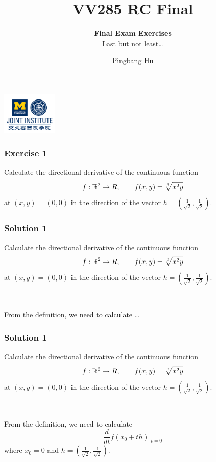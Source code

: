 \documentclass[10pt, t, allowdisplaybreaks]{beamer}
\title{VV285 RC Final}
\subtitle{\textbf{Final Exam Exercises}\\\large Last but not least\dots}
\institute[UM-SJTU JI]{University of Michigan-Shanghai Jiao Tong University Joint Institute}
\author{Pingbang Hu}
\newcommand{\nullspacesmall}{~\vspace{1em}}
\newcommand{\at}[3]{\left.#1\right\vert_{#2}^{#3}}
\begin{document}
\begin{frame}
    \titlepage
    \begin{center}
        \includegraphics[height=2cm]{Figures/logo/logo2.png}
    \end{center}
\end{frame}

\begin{frame}
    \frametitle{Exercise 1}
    \par Calculate the directional derivative of the continuous function
    \begin{equation*}
        f:\mathbb{R}^2\rightarrow R, \qquad f(x,y) = \sqrt[3]{x^2y}
    \end{equation*}
    at $(x,y) = (0,0)$ in the direction of the vector $h = (\frac{1}{\sqrt{2}}, \frac{1}{\sqrt{2}})$.
\end{frame}


\begin{frame}
    \frametitle{Solution 1}
    \par Calculate the directional derivative of the continuous function
    \begin{equation*}
        f:\mathbb{R}^2\rightarrow R, \qquad f(x,y) = \sqrt[3]{x^2y}
    \end{equation*}
    at $(x,y) = (0,0)$ in the direction of the vector $h = (\frac{1}{\sqrt{2}}, \frac{1}{\sqrt{2}})$.

    \nullspacesmall

    \par From the definition, we need to calculate \dots
\end{frame}

\begin{frame}
    \frametitle{Solution 1}
    \par Calculate the directional derivative of the continuous function
    \begin{equation*}
        f:\mathbb{R}^2\rightarrow R, \qquad f(x,y) = \sqrt[3]{x^2y}
    \end{equation*}
    at $(x,y) = (0,0)$ in the direction of the vector $h = (\frac{1}{\sqrt{2}}, \frac{1}{\sqrt{2}})$.

    \nullspacesmall

    \par From the definition, we need to calculate
    \begin{equation*}
        \frac{d}{dt} \at{f(x_0 + th)}{t = 0}{}
    \end{equation*}
    where $x_0 = 0$ and $h = (\frac{1}{\sqrt{2}}, \frac{1}{\sqrt{2}})$.
\end{frame}
\end{document}
